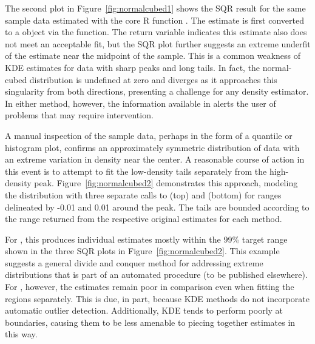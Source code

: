 The second plot in Figure~\ref{fig:normalcubed1} shows the SQR result for the same sample data estimated with the core R function .  The  estimate is first converted to a  object via the  function. The  return variable indicates this estimate also does not meet an acceptable fit, but the SQR plot further suggests an extreme underfit of the estimate near the midpoint of the sample. This is a common weakness of KDE estimates for data with sharp peaks and long tails. In fact, the normal-cubed distribution is undefined at zero and diverges as it approaches this singularity from both directions, presenting a challenge for any density estimator. In either method, however, the information available in  alerts the user of problems that may require intervention. 

A manual inspection of the sample data, perhaps in the form of a quantile or histogram plot, confirms an approximately symmetric distribution of data with an extreme variation in density near the center. A reasonable course of action in this event is to attempt to fit the low-density tails separately from the high-density peak.  Figure~\ref{fig:normalcubed2} demonstrates this approach, modeling the distribution with three separate calls to  (top) and  (bottom) for ranges delineated by -0.01 and 0.01 around the peak. The tails are bounded according to the range returned from the respective original estimates for each method. 

For , this produces individual estimates mostly within the 99\% target range shown in the three SQR plots in Figure~\ref{fig:normalcubed2}. This example suggests a general divide and conquer method for addressing extreme distributions that is part of an automated procedure (to be published elsewhere). For , however, the estimates remain poor in comparison even when fitting the regions separately. This is due, in part, because KDE methods do not incorporate automatic outlier detection. Additionally, KDE tends to perform poorly at boundaries, causing them to be less amenable to piecing together estimates in this way.

